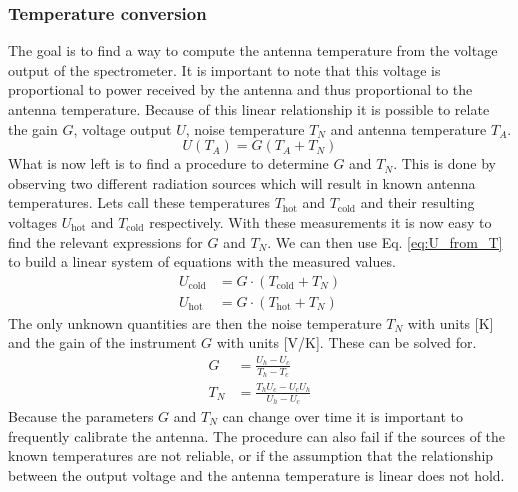 \subsubsection{Temperature conversion}\label{sec:antenna_temp}
The goal is to find a way to compute the antenna temperature from the voltage output of the spectrometer.
It is important to note that this voltage is proportional to power received by the antenna and thus proportional to the antenna temperature.
Because of this linear relationship it is possible to relate the gain $G$, voltage output $U$, noise temperature $T_N$ and antenna temperature $T_A$. \cite[Eq. (5)]{srt}
\begin{equation}
    U(T_A) = G(T_A + T_N) \label{eq:U_from_T}
\end{equation}
What is now left is to find a procedure to determine $G$ and $T_N$. This is done by observing two different radiation sources which will result in known antenna temperatures. Lets call these temperatures $T_\text{hot}$ and $T_\text{cold}$ and their resulting voltages $U_\text{hot}$ and $T_\text{cold}$ respectively.
With these measurements it is now easy to find the relevant expressions for $G$ and $T_N$.
We can then use Eq. \eqref{eq:U_from_T} to build a linear system of equations with the measured values.
\begin{equation} \label{eq:P_to_Ta_sys}
	\begin{split}
		U_\text{cold} &= G \cdot (T_\text{cold} + T_N) \\
		U_\text{hot} &= G \cdot (T_\text{hot} + T_N)
	\end{split}
\end{equation}
The only unknown quantities are then the noise temperature $T_N$ with units [K] and the gain of the instrument $G$ with units [V/K].
These can be solved for.
\begin{align}
	G &= \frac{U_h-U_c}{T_h-T_c}\label{eq:G}\\
	T_N &= \frac{T_h U_c-U_c U_h}{U_h-U_c}\label{eq:TN}
\end{align}
Because the parameters $G$ and $T_N$ can change over time it is important to frequently calibrate the antenna. The procedure can also fail if the sources of the known temperatures are not reliable, or if the assumption that the relationship between the output voltage and the antenna temperature is linear does not hold.

